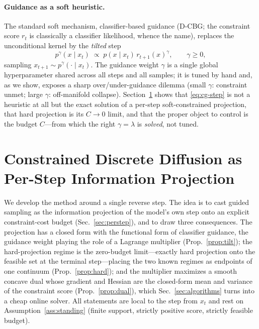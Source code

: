 \documentclass{article}
\begin{document}
\paragraph{Guidance as a soft heuristic.} The standard soft mechanism, classifier-based guidance (D-CBG; the constraint score $r_t$ is classically a classifier likelihood, whence the name), replaces the unconditional kernel by the \emph{tilted} step
\begin{equation}
\label{eq:cg-step}
p^{\gamma}(x\mid x_t)\;\propto\;p(x\mid x_t)\,r_{t+1}(x)^{\gamma},
\qquad \gamma\ge 0,
\end{equation}
sampling $x_{t+1}\sim p^\gamma(\cdot\mid x_t)$. The guidance weight $\gamma$ is a single global hyperparameter shared across all steps and all samples; it is tuned by hand and, as we show, exposes a sharp over/under-guidance dilemma (small $\gamma$: constraint unmet; large $\gamma$: off-manifold collapse). Section~\ref{sec:method} shows that \eqref{eq:cg-step} is not a heuristic at all but the exact solution of a per-step soft-constrained projection, that hard projection is its $C\to0$ limit, and that the proper object to control is the budget $C$---from which the right $\gamma=\lambda$ is \emph{solved}, not tuned.

\section{Constrained Discrete Diffusion as Per-Step Information Projection}
\label{sec:method}

We develop the method around a single reverse step. The idea is to cast guided sampling as the information projection of the model's own step onto an explicit constraint-cost budget (Sec.~\ref{sec:perstep}), and to draw three consequences. The projection has a closed form with the functional form of classifier guidance, the guidance weight playing the role of a Lagrange multiplier (Prop.~\ref{prop:tilt}); the hard-projection regime is the zero-budget limit---exactly hard projection onto the feasible set at the terminal step---placing the two known regimes as endpoints of one continuum (Prop.~\ref{prop:hard}); and the multiplier maximizes a smooth concave dual whose gradient and Hessian are the closed-form mean and variance of the constraint score (Prop.~\ref{prop:dual}), which Sec.~\ref{sec:algorithms} turns into a cheap online solver. All statements are local to the step from $x_t$ and rest on Assumption~\ref{ass:standing} (finite support, strictly positive score, strictly feasible budget).
\end{document}
